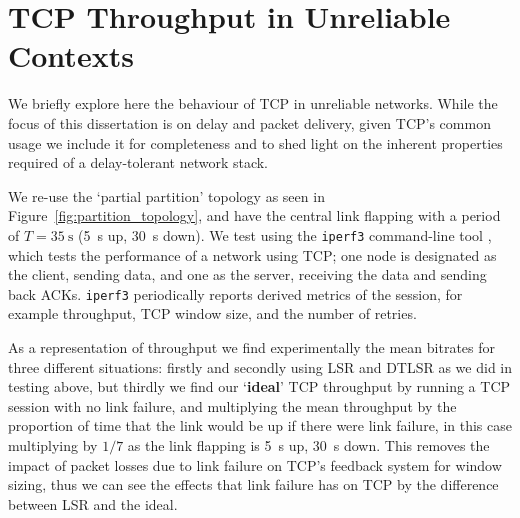 \documentclass[withindex,glossary,openany]{cam-thesis}
\begin{document}


\section{TCP Throughput in Unreliable Contexts}
\label{sec:tcp}

We briefly explore here the behaviour of TCP in unreliable networks. While the focus of this dissertation is on delay and packet delivery, given TCP's common usage we include it for completeness and to shed light on the inherent properties required of a delay-tolerant network stack.

We re-use the `partial partition' topology as seen in Figure~\ref{fig:partition_topology}, and have the central link flapping with a period of $T=\SI{35}{\s}$ (\SI{5}{\s} up, \SI{30}{\s} down). We test using the \texttt{iperf3} command-line tool \cite{IPERF}, which tests the performance of a network using TCP; one node is designated as the client, sending data, and one as the server, receiving the data and sending back ACKs. \texttt{iperf3} periodically reports derived metrics of the session, for example throughput, TCP window size, and the number of retries.

As a representation of throughput we find experimentally the mean bitrates for three different situations: firstly and secondly using LSR and DTLSR as we did in testing above, but thirdly we find our `\textbf{ideal}' TCP throughput by running a TCP session with no link failure, and multiplying the mean throughput by the proportion of time that the link would be up if there were link failure, in this case multiplying by $1/7$ as the link flapping is \SI{5}{\s} up, \SI{30}{\s} down. This removes the impact of packet losses due to link failure on TCP's feedback system for window sizing, thus we can see the effects that link failure has on TCP by the difference between LSR and the ideal.
\end{document}
